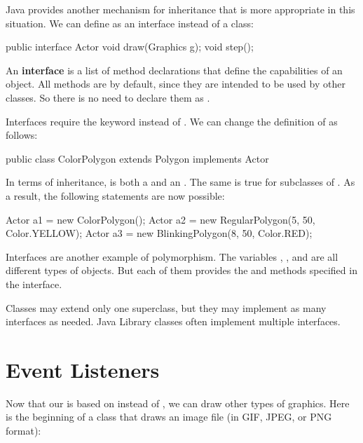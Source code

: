 
Java provides another mechanism for inheritance that is more appropriate in this situation.
We can define  as an interface instead of a class:

\begin{code}
public interface Actor {
    void draw(Graphics g);
    void step();
}
\end{code}


An {\bf interface} is a list of method declarations that define the capabilities of an object.
All methods are  by default, since they are intended to be used by other classes.
So there is no need to declare them as .

Interfaces require the keyword  instead of .
We can change the definition of  as follows:

\begin{code}
public class ColorPolygon extends Polygon implements Actor
\end{code}

In terms of inheritance,  is both a  and an .
The same is true for subclasses of .
As a result, the following statements are now possible:

\begin{code}
Actor a1 = new ColorPolygon();
Actor a2 = new RegularPolygon(5, 50, Color.YELLOW);
Actor a3 = new BlinkingPolygon(8, 50, Color.RED);
\end{code}


Interfaces are another example of polymorphism.
The variables , , and  are all different types of objects.
But each of them provides the  and  methods specified in the  interface.

Classes may extend only one superclass, but they may implement as many interfaces as needed.
Java Library classes often implement multiple interfaces.


\section{Event Listeners}

Now that our  is based on  instead of , we can draw other types of graphics.
Here is the beginning of a class that draws an image file (in GIF, JPEG, or PNG format):

